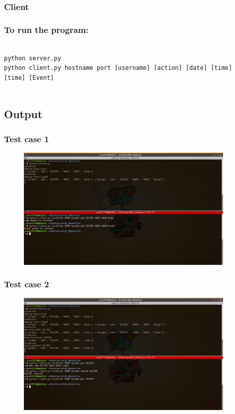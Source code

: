 \documentclass{article}
\begin{document}
  \subsubsection{Client}
  
  \newpage
  \subsubsection{To run the program:}
   \begin{verbatim}

python server.py
python client.py hostname port [username] [action] [date] [time] [time] [Event]


  \end{verbatim}
  
  \subsection{Output}
\subsubsection{Test case 1}
 \begin{figure}[H]
\centering
\includegraphics[width=400]{img/cal1.png}
\end{figure}

\subsubsection{Test case 2}
 \begin{figure}[H]
\centering
\includegraphics[width=400]{img/cal2.png}
\end{figure}
\end{document}
